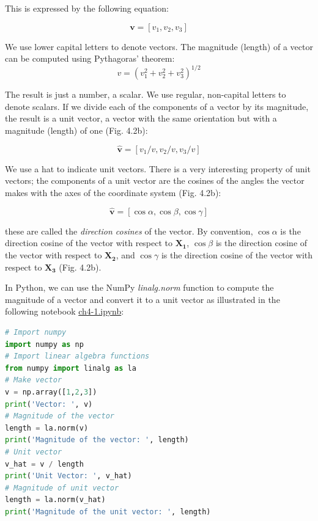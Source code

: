\documentclass[a4paper , 12pt]{book}
\begin{document}
This is expressed by the following equation:

\begin{equation}
    \mathbf{v} = [v_1,v_2,v_3]
\end{equation}

We use lower capital letters to denote vectors. The magnitude (length) of a vector can be computed using Pythagoras' theorem:
\begin{equation}
    v = (v_1^2+v_2^2+v_3^2)^{1/2}
\end{equation}

The result is just a number, a scalar. We use regular, non-capital letters to denote scalars. If we divide each of the components of a vector by its magnitude, the result is a unit vector, a vector with the same orientation but with a magnitude (length) of one (Fig. 4.2b):

\begin{equation}
    \mathbf{\hat{v}}=[v_1/v,v_2/v,v_3/v]
\end{equation}

We use a hat to indicate unit vectors. There is a very interesting property of unit vectors; the components of a unit vector are the cosines of the angles the vector makes with the axes of the coordinate system (Fig. 4.2b):

\begin{equation}
    \mathbf{\hat v} = [\cos\alpha,\cos\beta,\cos\gamma]
\end{equation}

these are called the \textit{direction cosines} of the vector. By convention, $\cos\alpha$ is the direction cosine of the vector with respect to $\mathbf{X_1}$, $\cos\beta$ is the direction cosine of the vector with respect to $\mathbf{X_2}$, and $\cos\gamma$ is the direction cosine of the vector with respect to $\mathbf{X_3}$ (Fig. 4.2b).

In Python, we can use the NumPy \textit{linalg.norm} function to compute the magnitude of a vector and convert it to a unit vector as illustrated in the following notebook \href{http://github.com}{ch4-1.ipynb}:

\begin{center}
\begin{lstlisting}[language=Python, frame=single]
# Import numpy
import numpy as np
# Import linear algebra functions
from numpy import linalg as la
# Make vector
v = np.array([1,2,3])
print('Vector: ', v)
# Magnitude of the vector
length = la.norm(v) 
print('Magnitude of the vector: ', length)
# Unit vector
v_hat = v / length
print('Unit Vector: ', v_hat)
# Magnitude of unit vector
length = la.norm(v_hat) 
print('Magnitude of the unit vector: ', length)
\end{lstlisting}
\end{center}
\end{document}
